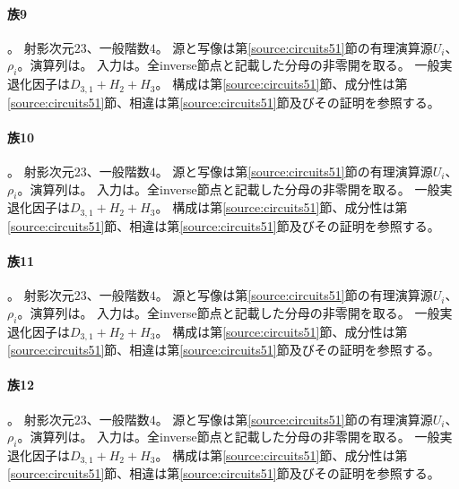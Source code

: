 \paragraph{族9}\label{catalogue:T09}
。
射影次元$23$、一般階数$4$。
源と写像は第\ref{source:circuits51}節の有理演算源$U_i$、$\rho_i$。演算列は。
入力は。全inverse節点と記載した分母の非零開を取る。
一般実退化因子は$D_{3,1}+H_{2}+H_{3}$。
構成は第\ref{source:circuits51}節、成分性は第\ref{source:circuits51}節、相違は第\ref{source:circuits51}節及びその証明を参照する。

\paragraph{族10}\label{catalogue:T10}
。
射影次元$23$、一般階数$4$。
源と写像は第\ref{source:circuits51}節の有理演算源$U_i$、$\rho_i$。演算列は。
入力は。全inverse節点と記載した分母の非零開を取る。
一般実退化因子は$D_{3,1}+H_{2}+H_{3}$。
構成は第\ref{source:circuits51}節、成分性は第\ref{source:circuits51}節、相違は第\ref{source:circuits51}節及びその証明を参照する。

\paragraph{族11}\label{catalogue:T11}
。
射影次元$23$、一般階数$4$。
源と写像は第\ref{source:circuits51}節の有理演算源$U_i$、$\rho_i$。演算列は。
入力は。全inverse節点と記載した分母の非零開を取る。
一般実退化因子は$D_{3,1}+H_{2}+H_{3}$。
構成は第\ref{source:circuits51}節、成分性は第\ref{source:circuits51}節、相違は第\ref{source:circuits51}節及びその証明を参照する。

\paragraph{族12}\label{catalogue:T12}
。
射影次元$23$、一般階数$4$。
源と写像は第\ref{source:circuits51}節の有理演算源$U_i$、$\rho_i$。演算列は。
入力は。全inverse節点と記載した分母の非零開を取る。
一般実退化因子は$D_{3,1}+H_{2}+H_{3}$。
構成は第\ref{source:circuits51}節、成分性は第\ref{source:circuits51}節、相違は第\ref{source:circuits51}節及びその証明を参照する。

